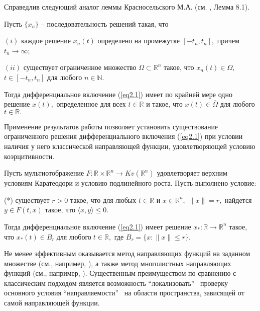 Справедлив следующий аналог леммы Красносельского М.А. (см. \cite{k_kr}, Лемма 8.1).

\begin{lemma}
Пусть $\{x_n\}$ -- последовательность решений  такая, что

$(i)$  каждое решение $x_n(t)$ определено на промежутке $[-t_n, t_n],$ причем $t_n\to \infty$;

$(ii)$ существует ограниченное множество $\Omega\subset \mathbb{R}^n$ такое, что $x_n(t)\in\Omega,$ $t\in[-t_n,t_n]$ для любого $n\in \mathbb{N}.$

Тогда дифференциальное включение (\ref{eq2.1}) имеет по крайней мере одно решение $x(t),$ определенное для всех $t\in \mathbb{R}$ и такое, что $x(t)\in\overline{\Omega}$ для любого $t\in \mathbb{R}.$
\end{lemma}

Применение результатов работы \cite{o_k_k} позволяет установить существование ограниченного решения диф\-ференциального включения (\ref{eq2.1}) при условии наличия у него классической направляющей функции, удовлетворяющей условию коэрцитивности.

\begin{theorem}
Пусть мультиотображение $F:\mathbb{R} \times \mathbb{R}^n \to Kv(\mathbb{R}^n)$ удовлетворяет верхним условиям Каратеодори и условию подлинейного роста. Пусть выполнено условие:

(*) существует $r>0$ такое, что для любых $t\in \mathbb{R}$ и $x \in \mathbb{R}^n, \; \|x\|=r,$ найдется $y\in F(t,x)$ такое, что
$
\langle x, y \rangle\leq 0.
$

Тогда дифференциальное включение (\ref{eq2.1}) имеет решение $x_*:\mathbb{R}\to \mathbb{R}^n$ такое, что
$
x_*(t)\in B_r \;\mbox{для любого} \; t\in\mathbb{R},
$
где $B_r=\{x:\|x\|\leq r\}.$
\end{theorem}

Не менее эффективным оказывается метод направляющих функций на заданном множестве (см., например, \cite{k_k_o}), а также метод многолистных направляющих функций (см., например, \cite{k_k_o_z_2}). Существенным преимуществом по сравнению с классическим подходом является возможность ``локализовать'' $\,$ проверку основного условия ``направляемости'' $\,$ на области пространства, зависящей от самой направляющей функции.


%

